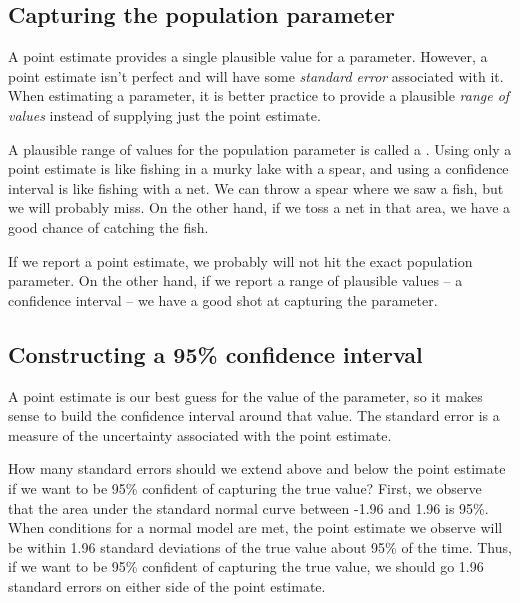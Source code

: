 \subsection{Capturing the population parameter}

A point estimate provides a single plausible value for a parameter. However, a point estimate isn't perfect and will have some \emph{standard error} associated with it. When estimating a parameter,
it is better practice to provide a plausible
\emph{range of values} instead of supplying just the point
estimate.

A plausible range of values for the population parameter is called a . Using only a point estimate is like fishing in a murky lake with a spear, and using a confidence interval is like fishing with a net. We can throw a spear where we saw a fish, but we will probably miss. On the other hand, if we toss a net in that area, we have a good chance of catching the fish.

If we report a point estimate, we probably will not hit the exact population parameter. On the other hand, if we report a range of plausible values -- a confidence interval -- we have a good shot at capturing the parameter.


\D{\newpage}

\subsection{Constructing a 95\% confidence interval}

A point estimate is our best guess for the value of the parameter, so it makes sense to build the confidence interval around that value. The standard error is a measure of the uncertainty associated with the point estimate.  

\begin{examplewrap}
\begin{nexample}{How many standard errors should we extend above and below the point estimate if we want to be 95\% confident of capturing the true value?  }
First, we observe that the area under the standard normal curve between -1.96 and 1.96 is 95\%.  When conditions for a normal model are met, the point estimate we observe will be within 1.96 standard deviations of the true value about 95\% of the time.  Thus, if we want to be 95\% confident of capturing the true value, we should go 1.96 standard errors on either side of the point estimate.
\end{nexample}
\end{examplewrap}

